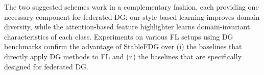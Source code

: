 \documentclass{article}
\theoremstyle{plain}
\theoremstyle{definition}
\theoremstyle{remark}
\begin{document}
\vspace{-1mm}


The two suggested schemes  work in a complementary fashion, each providing one necessary component for federated DG: our style-based learning
improves domain diversity, while the attention-based feature highlighter   learns domain-invariant characteristics of each class.  Experiments on various  FL setups using  DG benchmarks confirm the advantage of  StableFDG over   (i) the  baselines that directly apply DG methods to FL and (ii)  the    baselines that are specifically designed for federated DG. 





\vspace{-1mm}
\end{document}
